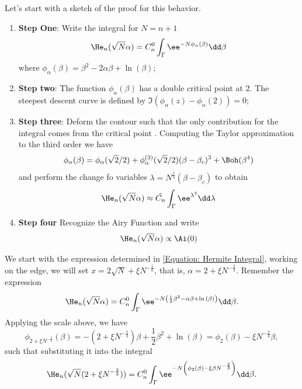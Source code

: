 Let's start with a sketch of the proof for this behavior.
\begin{enumerate}
	\item \textbf{Step One}: Write the integral for $N = n + 1$
	\begin{equation}
		\He_n(\sqrt{N}\alpha) = C_n^0 \int_{\Gamma}  \ee^{-N \phi_\alpha(\beta) } \dd \beta
	\end{equation} 
	where $\phi_\alpha(\beta) = \beta^2 -2 \alpha \beta + \ln{(\beta)}$;
	\item \textbf{Step two}: The function $\phi_{\alpha}(\beta)$ has a double critical point at $2$. The steepest descent curve is defined by $\Im(\phi_{\alpha}(z) - \phi_{\alpha}(2)) = 0$;
	\item \textbf{Step three}: Deform the contour such that the only contribution for the integral comes from the critical point . Computing the Taylor approximation to the third order we have
	\begin{equation}
		\phi_{\alpha}(\beta) = \phi_\alpha(\sqrt{2}/2) + \phi^{(3)}_\alpha(\sqrt{2}/2) (\beta - \beta_c)^3 + \Boh(\beta^4)  
	\end{equation}
	and perform the change fo variables $\lambda = N^{\frac{1}{3}}(\beta-\beta_c)$ to obtain
	\begin{equation}
		\He_n(\sqrt{N}\alpha) \approx \tilde{C_n} \int_{\Gamma}  \ee^{\lambda^3} \dd \lambda
	\end{equation} 
	\item \textbf{Step four} Recognize the Airy Function and write
	\begin{equation}
		\He_n(\sqrt{N}\alpha) \propto \Ai(0)
	\end{equation}
\end{enumerate}

We start with the expression determined in \eqref{Equation: Hermite Integral}, working on the edge, we will set $x = 2\sqrt{N} + \xi N^{-\frac{1}{6}}$, that is, $\alpha = 2 + \xi N^{-\frac{2}{3}}$. Remember the expression
\begin{equation}
	\He_n(\sqrt{N}\alpha) = C_n^0 \int_{\Gamma}  \ee^{-N \left( \frac{1}{2} \beta^2 - \alpha \beta + \ln{(\beta)} \right) } \dd \beta.
\end{equation}
Applying the scale above, we have
\begin{equation}
	\phi_{2 + \xi N^{-\frac{2}{3}}}(\beta) = -(2 + \xi N^{-\frac{2}{3}})\beta + \frac{1}{2} \beta^2 + \ln(\beta) = \phi_{2}(\beta) - \xi N^{-\frac{2}{3}} \beta,
\end{equation}
such that substituting it into the integral
\begin{equation}
	\He_n(\sqrt{N}(2 + \xi N^{-\frac{2}{3}})) = C_n^0 \int_{\Gamma}  \ee^{-N \left( \phi_{2}(\beta) - \xi \beta N^{-\frac{2}{3}} \right) } \dd \beta.
\end{equation}

